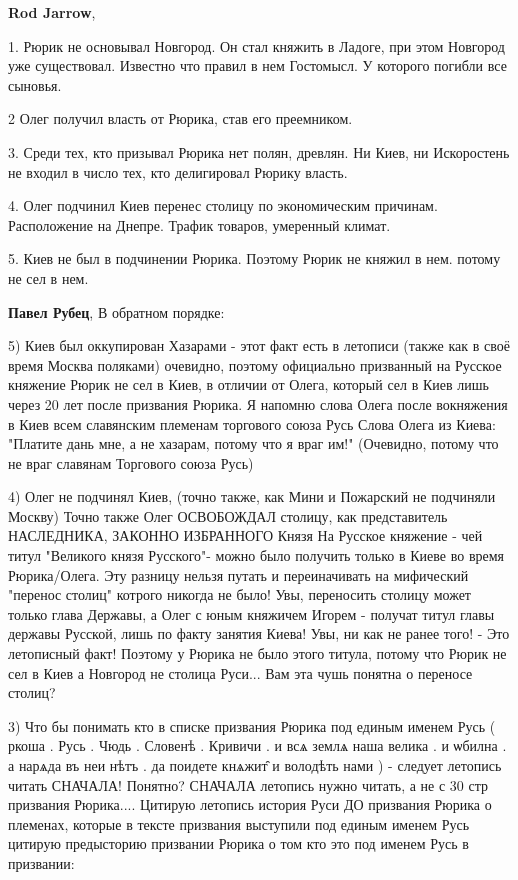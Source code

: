 \begin{itemize}
\begin{itemize}
\textbf{Rod Jarrow}, 

1. Рюрик не основывал Новгород. Он стал княжить в Ладоге, при этом Новгород уже
существовал. Известно что правил в нем Гостомысл. У которого погибли все
сыновья.

2 Олег получил власть от Рюрика, став его преемником.

3. Среди тех, кто призывал Рюрика нет полян, древлян. Ни Киев, ни Искоростень
не входил в число тех, кто делигировал Рюрику власть.

4. Олег подчинил Киев перенес столицу по экономическим причинам. Расположение
на Днепре. Трафик товаров, умеренный климат.

5. Киев не был в подчинении Рюрика. Поэтому Рюрик не княжил в нем. потому не
сел в нем.

\textbf{Павел Рубец}, В обратном порядке:

5) Киев был оккупирован Хазарами - этот факт есть в летописи (также как в своё
время Москва поляками) очевидно, поэтому официально призванный на Русское
княжение Рюрик не сел в Киев, в отличии от Олега, который сел в Киев лишь через
20 лет после призвания Рюрика. Я напомню слова Олега после вокняжения в Киев
всем славянским племенам торгового союза Русь Слова Олега из Киева: "Платите
дань мне, а не хазарам, потому что я враг им!" (Очевидно, потому что не враг
славянам Торгового союза Русь)

4) Олег не подчинял Киев, (точно также, как Мини и Пожарский не подчиняли
Москву) Точно также Олег ОСВОБОЖДАЛ столицу, как представитель НАСЛЕДНИКА,
ЗАКОННО ИЗБРАННОГО Князя На Русское княжение - чей титул "Великого князя
Русского"- можно было получить только в Киеве во время Рюрика/Олега. Эту
разницу нельзя путать и переиначивать на мифический "перенос столиц" котрого
никогда не было! Увы, переносить столицу может только глава Державы, а Олег с
юным княжичем Игорем - получат титул главы державы Русской, лишь по факту
занятия Киева! Увы, ни как не ранее того! - Это летописный факт! Поэтому у
Рюрика не было этого титула, потому что Рюрик не сел в Киев а Новгород не
столица Руси... Вам эта чушь понятна о переносе столиц?

3) Что бы понимать кто в списке призвания Рюрика под единым именем Русь ( ркоша
. Русь . Чюдь . Словенѣ . Кривичи . и всѧ землѧ наша велика . и ѡбилна . а
нарѧда въ неи нѣтъ . да поидете кнѧжит̑ и володѣть нами ) - следует летопись
читать СНАЧАЛА! Понятно? СНАЧАЛА летопись нужно читать, а не с 30 стр призвания
Рюрика.... Цитирую летопись история Руси ДО призвания Рюрика о племенах,
которые в тексте призвания выступили под единым именем Русь цитирую предысторию
призвании Рюрика о том кто это под именем Русь в призвании:


\end{itemize}
\end{itemize}
